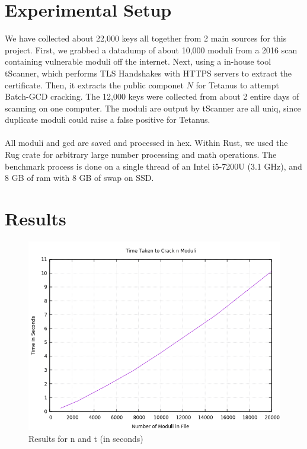 \documentclass[10pt, letterpaper]{article}
\begin{document}
\section{Experimental Setup}
We have collected about 22,000 keys all together from 2 main sources for this project. First, we grabbed a datadump of about 10,000 moduli from a 2016 scan containing vulnerable moduli off the internet. Next, using a in-house tool tScanner, which performs TLS Handshakes with HTTPS servers to extract the certificate. Then, it extracts the public componet $N$ for Tetanus to attempt Batch-GCD cracking. The 12,000 keys were collected from about 2 entire days of scanning on one computer. The moduli are output by tScanner are all uniq, since duplicate moduli could raise a false positive for Tetanus.\\
\\
All moduli and gcd are saved and processed in hex. Within Rust, we used the Rug crate for arbitrary large number processing and math operations. The benchmark process is done on a single thread of an Intel i5-7200U (3.1 GHz), and 8 GB of ram with 8 GB of swap on SSD. 

\section{Results}
\begin{figure}[htp]
  \begin{center}
    \includegraphics{batch-gcd-time.png}
    \caption{Results for n and t (in seconds)}
  \end{center}
\end{figure}
\end{document}
